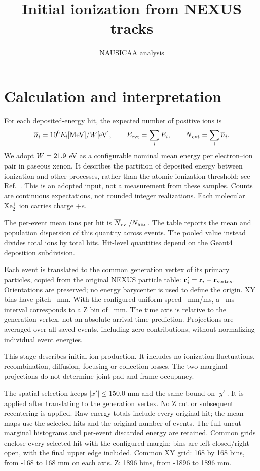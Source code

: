 \documentclass[10pt,a4paper]{article}
\title{Initial ionization from NEXUS tracks}
\author{NAUSICAA analysis}\date{}
\begin{document}
\maketitle
\section{Calculation and interpretation}
For each deposited-energy hit, the expected number of positive ions is
\[
 \overline n_i=10^6 E_i[\mathrm{MeV}]/W[\mathrm{eV}],\qquad
 E_{\rm evt}=\sum_i E_i,\qquad \overline N_{\rm evt}=\sum_i\overline n_i.
\]
We adopt $W=21.9$ eV as a configurable nominal mean energy per electron--ion
pair in gaseous xenon. It describes the partition of deposited energy between
ionization and other processes, rather than the atomic ionization threshold;
see Ref.~\cite{Serra:2014zda}. This is an adopted input, not a measurement from these samples.
Counts are continuous expectations, not rounded integer realizations. Each
molecular $\mathrm{Xe}_2^+$ ion carries charge $+e$.

The per-event mean ions per hit is $\overline N_{\rm evt}/N_{\rm hits}$.
The table reports the mean and population dispersion of this quantity across
events. The pooled value instead divides total ions by total hits. Hit-level
quantities depend on the Geant4 deposition subdivision.

Each event is translated to the common generation vertex of its primary
particles, copied from the original NEXUS particle table:
$\mathbf r'_i=\mathbf r_i-\mathbf r_{\rm vertex}$. Orientations are preserved;
no energy barycenter is used to define the origin.
XY bins have pitch \IonPitchMm~mm. With the configured uniform speed
\IonSpeedMmMs~mm/ms, a \IonFrameMs~ms interval corresponds to a Z bin of
\IonZBinMm~mm. The time axis is relative to the generation vertex, not an absolute
arrival-time prediction. Projections are averaged over all saved events,
including zero contributions, without normalizing individual event energies.

This stage describes initial ion production. It includes no ionization
fluctuations, recombination, diffusion, focusing or collection losses.
The two marginal projections do not determine joint pad-and-frame occupancy.

\par The spatial selection keeps $|x'|\leq 150.0$ mm and the same bound on $|y'|$. It is applied after translating to the generation vertex. No Z cut or subsequent recentering is applied. Raw energy totals include every original hit; the mean maps use the selected hits and the original number of events. The full uncut marginal histograms and per-event discarded energy are retained. Common grids enclose every selected hit with the configured margin; bins are left-closed/right-open, with the final upper edge included.
Common XY grid: 168 by 168 bins, from -168 to 168 mm on each axis. Z: 1896 bins, from -1896 to 1896 mm.
\clearpage
\end{document}
